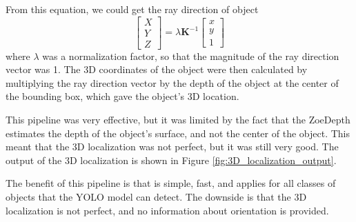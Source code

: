 From this equation, we could get the ray direction of object
\begin{equation}\label{eq:ray_direction}
    \begin{bmatrix}
        X \\
        Y \\
        Z
    \end{bmatrix}
    =
    \lambda \mathbf{K}^{-1}\begin{bmatrix}
        x \\
        y \\
        1
    \end{bmatrix} 
\end{equation}
where $\lambda$ was a normalization factor, so that the magnitude of the ray direction vector was 1. The 3D coordinates of the object were then calculated by multiplying the ray direction vector by the depth of the object at the center of the bounding box, which gave the object's 3D location.

This pipeline was very effective, but it was limited by the fact that the ZoeDepth estimates the depth of the object's surface, and not the center of the object. This meant that the 3D localization was not perfect, but it was still very good. The output of the 3D localization is shown in Figure \ref{fig:3D_localization_output}.

The benefit of this pipeline is that is simple, fast, and applies for all classes of objects that the YOLO model can detect. The downside is that the 3D localization is not perfect, and no information about orientation is provided.

